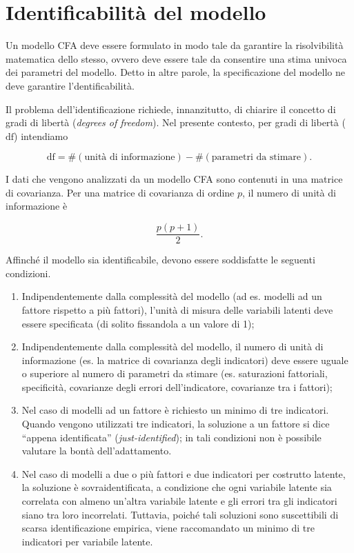 \documentclass[
  11pt,
]{krantz}
\providecommand{\tightlist}{%
  \setlength{\itemsep}{0pt}\setlength{\parskip}{0pt}}
\theoremstyle{definition}
\theoremstyle{definition}
\theoremstyle{definition}
\theoremstyle{definition}
\theoremstyle{remark}
\begin{document}
\hypertarget{identificabilituxe0-del-modello}{%
\section{Identificabilità del modello}\label{identificabilituxe0-del-modello}}

Un modello CFA deve essere formulato in modo tale da garantire la risolvibilità matematica dello stesso, ovvero deve essere tale da consentire una stima univoca dei parametri del modello. Detto in altre parole, la specificazione del modello ne deve garantire l'dentificabilità.

Il problema dell'identificazione richiede, innanzitutto, di chiarire il concetto di gradi di libertà (\emph{degrees of freedom}). Nel presente contesto, per gradi di libertà (\(\mbox{df}\)) intendiamo

\[
\mbox{df} = \# (\text{unità di informazione}) - \# (\text{parametri da stimare}).
\]

I dati che vengono analizzati da un modello CFA sono contenuti in una matrice di covarianza. Per una matrice di covarianza di ordine \(p\), il numero di unità di informazione è

\[
\frac{p (p+1)}{2}.
\]

Affinché il modello sia identificabile, devono essere soddisfatte le seguenti condizioni.

\begin{enumerate}
\def\labelenumi{\arabic{enumi}.}
\tightlist
\item
  Indipendentemente dalla complessità del modello (ad es. modelli ad un fattore rispetto a più fattori), l'unità di misura delle variabili latenti deve essere specificata (di solito fissandola a un valore di 1);
\item
  Indipendentemente dalla complessità del modello, il numero di unità di informazione (es. la matrice di covarianza degli indicatori) deve essere uguale o superiore al numero di parametri da stimare (es. saturazioni fattoriali, specificità, covarianze degli errori dell'indicatore, covarianze tra i fattori);
\item
  Nel caso di modelli ad un fattore è richiesto un minimo di tre indicatori. Quando vengono utilizzati tre indicatori, la soluzione a un fattore si dice ``appena identificata'' (\emph{just-identified}); in tali condizioni non è possibile valutare la bontà dell'adattamento.
\item
  Nel caso di modelli a due o più fattori e due indicatori per costrutto latente, la soluzione è sovraidentificata, a condizione che ogni variabile latente sia correlata con almeno un'altra variabile latente e gli errori tra gli indicatori siano tra loro incorrelati. Tuttavia, poiché tali soluzioni sono suscettibili di scarsa identificazione empirica, viene raccomandato un minimo di tre indicatori per variabile latente.
\end{enumerate}
\end{document}
